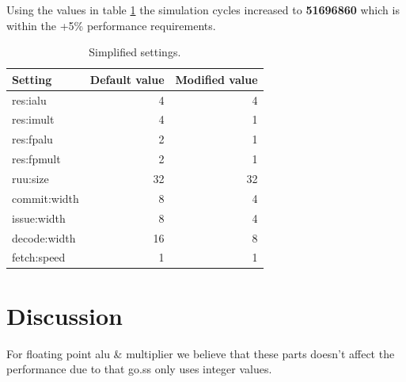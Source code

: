 \documentclass[titlepage, a4paper]{article}
\begin{document}
Using the values in table \ref{tab:simplified} the simulation cycles increased to \textbf{51696860} which is within the +5\% performance requirements.

\begin{table}[H]
\centering
\caption{Simplified settings.}

\begin{tabular}{|l|r|r|}
  \hline
  \textbf{Setting} & \textbf{Default value} & \textbf{Modified value} \\ \hline
  res:ialu & 4 & 4 \\ \hline
  res:imult & 4 & 1 \\ \hline
  res:fpalu & 2 & 1 \\ \hline
  res:fpmult & 2 & 1 \\ \hline
  ruu:size & 32 & 32 \\ \hline
  commit:width & 8 & 4 \\ \hline
  issue:width & 8 & 4 \\ \hline
  decode:width & 16 & 8 \\ \hline
  fetch:speed & 1 & 1 \\ \hline
\end{tabular}

\label{tab:simplified}
\end{table}

\section{Discussion}
For floating point alu \& multiplier we believe that these parts doesn't affect the performance due to that go.ss only uses integer values.
\end{document}
